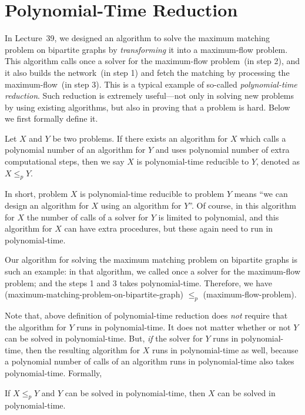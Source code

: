 \setcounter{definition}{0} \setcounter{property}{0} \setcounter{claim}{0} \setcounter{fact}{0} \setcounter{corollary}{0} \setcounter{figure}{0}
\section{Polynomial-Time Reduction}

In Lecture~39, we designed an algorithm to solve the maximum matching problem on bipartite graphs
by \emph{transforming} it into a maximum-flow problem. This algorithm calls once a
solver for the maximum-flow problem~(in step 2), and it also builds the network~(in step 1)
and fetch the matching by processing the maximum-flow~(in step 3). This is a typical
example of so-called \emph{polynomial-time reduction}.
Such {reduction} is extremely useful---not only in solving new problems by using existing algorithms,
but also in proving that a problem is hard. Below we first formally define it.

\begin{definition}
Let $X$ and $Y$ be two problems.
If there exists an algorithm for $X$ which
calls a polynomial number of an algorithm for $Y$
and uses polynomial number of extra computational steps,
then we say $X$ is polynomial-time reducible to $Y$, denoted as $X \le_p Y$.
\end{definition}

In short, problem $X$ is polynomial-time reducible to problem $Y$ means ``we can design an algorithm for $X$ using an algorithm for $Y$''.
Of course, in this algorithm for $X$ the number of calls of a solver for $Y$ is limited to polynomial, and this algorithm for $X$
can have extra procedures, but these again need to run in polynomial-time.

Our algorithm for solving the maximum matching problem on bipartite graphs is such an example:
in that algorithm, we called once a solver for the maximum-flow problem; and the steps 1 and 3
takes polynomial-time. Therefore, we have (maximum-matching-problem-on-bipartite-graph) $\le_p$ (maximum-flow-problem).

Note that, above definition of polynomial-time reduction does \emph{not} require that
the algorithm for $Y$ runs in polynomial-time. It does not matter whether or not $Y$ can
be solved in polynomial-time. But, \emph{if} the solver for $Y$ runs in polynomial-time,
then the resulting algorithm for $X$ runs in polynomial-time as well, because 
a polynomial number of calls of an algorithm runs in polynomial-time also takes polynomial-time.
Formally,
\begin{fact}
If $X\le_p Y$ and $Y$ can be solved in polynomial-time, then $X$ can be solved in polynomial-time.
\end{fact}

